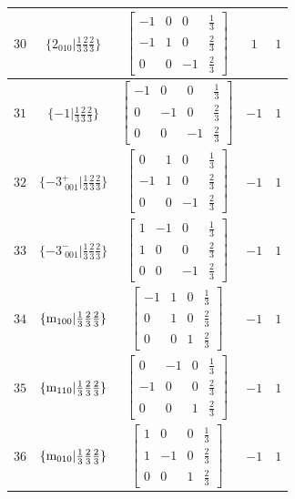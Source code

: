 \documentclass[fleqn,8pt]{jsarticle}
\begin{document}
\begin{longtable}{ccccc}
$ 30 $ & $ \{2{}_{010}|\frac{1}{3} \frac{2}{3} \frac{2}{3}\} $ & $ \begin{bmatrix} -1 & 0 & 0 & \frac{1}{3} \\ -1 & 1 & 0 & \frac{2}{3} \\ 0 & 0 & -1 & \frac{2}{3} \end{bmatrix} $ & $ 1 $ & $ 1 $ \\ \hline
$ 31 $ & $ \{-1|\frac{1}{3} \frac{2}{3} \frac{2}{3}\} $ & $ \begin{bmatrix} -1 & 0 & 0 & \frac{1}{3} \\ 0 & -1 & 0 & \frac{2}{3} \\ 0 & 0 & -1 & \frac{2}{3} \end{bmatrix} $ & $ -1 $ & $ 1 $ \\ \hline
$ 32 $ & $ \{-3^{+}_{\,\,001}|\frac{1}{3} \frac{2}{3} \frac{2}{3}\} $ & $ \begin{bmatrix} 0 & 1 & 0 & \frac{1}{3} \\ -1 & 1 & 0 & \frac{2}{3} \\ 0 & 0 & -1 & \frac{2}{3} \end{bmatrix} $ & $ -1 $ & $ 1 $ \\ \hline
$ 33 $ & $ \{-3^{-}_{\,\,001}|\frac{1}{3} \frac{2}{3} \frac{2}{3}\} $ & $ \begin{bmatrix} 1 & -1 & 0 & \frac{1}{3} \\ 1 & 0 & 0 & \frac{2}{3} \\ 0 & 0 & -1 & \frac{2}{3} \end{bmatrix} $ & $ -1 $ & $ 1 $ \\ \hline
$ 34 $ & $ \{{\rm m}_{100}|\frac{1}{3} \frac{2}{3} \frac{2}{3}\} $ & $ \begin{bmatrix} -1 & 1 & 0 & \frac{1}{3} \\ 0 & 1 & 0 & \frac{2}{3} \\ 0 & 0 & 1 & \frac{2}{3} \end{bmatrix} $ & $ -1 $ & $ 1 $ \\ \hline
$ 35 $ & $ \{{\rm m}_{110}|\frac{1}{3} \frac{2}{3} \frac{2}{3}\} $ & $ \begin{bmatrix} 0 & -1 & 0 & \frac{1}{3} \\ -1 & 0 & 0 & \frac{2}{3} \\ 0 & 0 & 1 & \frac{2}{3} \end{bmatrix} $ & $ -1 $ & $ 1 $ \\ \hline
$ 36 $ & $ \{{\rm m}_{010}|\frac{1}{3} \frac{2}{3} \frac{2}{3}\} $ & $ \begin{bmatrix} 1 & 0 & 0 & \frac{1}{3} \\ 1 & -1 & 0 & \frac{2}{3} \\ 0 & 0 & 1 & \frac{2}{3} \end{bmatrix} $ & $ -1 $ & $ 1 $ \\
\end{longtable}
\end{document}
